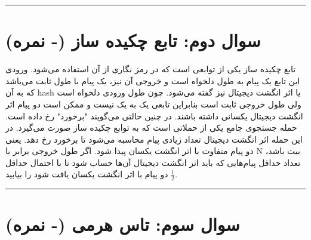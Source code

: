 \documentclass[a4paper,11pt]{article}
\begin{document}
\vspace{2mm}
\hrule
\vspace{8mm}
			  						  			  
\section*{ 		
\textbf {سوال دوم: تابع چکیده ساز (- نمره)  }
\\}

تابع چکیده ساز  یکی از توابعی است که در رمز نگاری از آن استفاده می‌شود. ورودی این تابع یک پیام به طول دلخواه است و خروجی آن نیز، یک پیام با طول ثابت می‌باشد که به آن hash یا اثر انگشت دیجیتال نیز گفته می‌شود. چون طول ورودی دلخواه است ولی طول خروجی ثابت است بنابراین تابعی یک به یک نیست و ممکن است دو پیام اثر انگشت دیجیتال یکسانی داشته باشند. در چنین حالتی می‌گویند "برخورد" رخ داده است. حمله جستجوی جامع یکی از حملاتی است که به توابع چکیده ساز صورت می‌گیرد. در این حمله اثر انگشت دیجیتال تعداد زیادی پیام محاسبه می‌شود تا برخورد رخ دهد. یعنی دو پیام متفاوت با اثر انگشت یکسان پیدا شود. اگر طول خروجی برابر با N بیت باشد، تعداد حداقل پیام‌هایی که باید اثر انگشت دیجیتال آن‌ها حساب شود تا با احتمال حداقل $\frac{1}{2}$ دو پیام با اثر انگشت یکسان یافت شود را بیابید. 


\vspace{2mm}
\hrule
\vspace{4mm}

\newpage 
\section*{
\textbf { سوال سوم: تاس هرمی (- نمره)  }
\\ }
\end{document}
